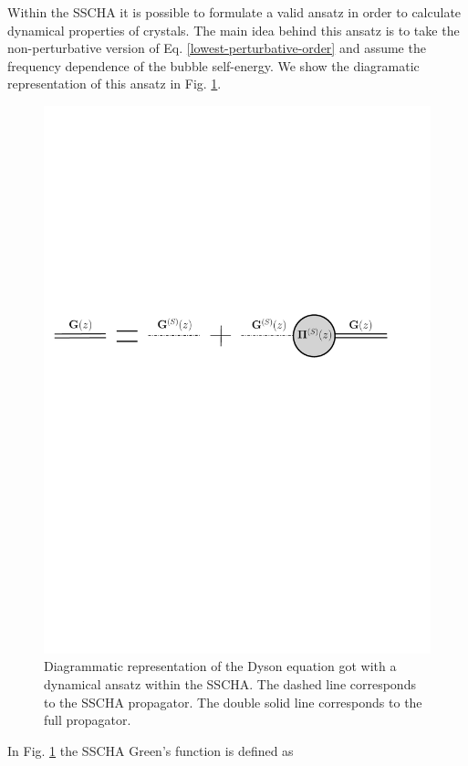Within the SSCHA it is possible to formulate a valid ansatz in order to calculate dynamical properties of crystals. The main idea behind this ansatz is to take the non-perturbative 
version of Eq. \ref{lowest-perturbative-order} and assume the frequency dependence of the bubble self-energy. We show the diagramatic representation of this ansatz in Fig. \ref{green-ansatz}. 
\begin{figure}[h]
\begin{center}
\includegraphics[width=0.95\linewidth]{Figures/dyson-ansatz.pdf}
\caption[Diagramtic representation of Dyson equation got with a dynamical ansatz within the SSCHA]{Diagrammatic representation of the Dyson equation got with a dynamical ansatz within the SSCHA. The dashed line corresponds to the 
SSCHA propagator. The double solid line corresponds to the full propagator.}
\label{green-ansatz}
\end{center}
\end{figure}
In Fig. \ref{green-ansatz} the SSCHA Green's function is defined as
